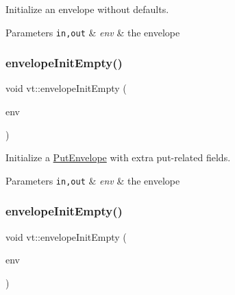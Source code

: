 Initialize an envelope without defaults. 


\begin{DoxyParams}[1]{Parameters}
\mbox{\tt in,out}  & {\em env} & the envelope \\
\hline
\end{DoxyParams}
\mbox{\label{namespacevt_ab507eac4b5cf7e2712f2c626b379498e}} 
\subsubsection{\texorpdfstring{envelope\+Init\+Empty()}{envelopeInitEmpty()}\hspace{0.1cm}{\footnotesize\ttfamily [2/5]}}
{\footnotesize\ttfamily void vt\+::envelope\+Init\+Empty (\begin{DoxyParamCaption}\item[{\hyperlink{namespacevt_a8d7a7de9e76bfea1600009a775b7298c}{Put\+Short\+Envelope} \&}]{env }\end{DoxyParamCaption})\hspace{0.3cm}{\ttfamily [inline]}}



Initialize a {\ttfamily \hyperlink{structvt_1_1_put_envelope}{Put\+Envelope}} with extra put-\/related fields. 


\begin{DoxyParams}[1]{Parameters}
\mbox{\tt in,out}  & {\em env} & the envelope \\
\hline
\end{DoxyParams}
\mbox{\label{namespacevt_ae56472f58b6582abacae687ead397380}} 
\subsubsection{\texorpdfstring{envelope\+Init\+Empty()}{envelopeInitEmpty()}\hspace{0.1cm}{\footnotesize\ttfamily [3/5]}}
{\footnotesize\ttfamily void vt\+::envelope\+Init\+Empty (\begin{DoxyParamCaption}\item[{\hyperlink{namespacevt_af71a025689a3da5037785b53a7a8e78c}{Epoch\+Envelope} \&}]{env }\end{DoxyParamCaption})\hspace{0.3cm}{\ttfamily [inline]}}



